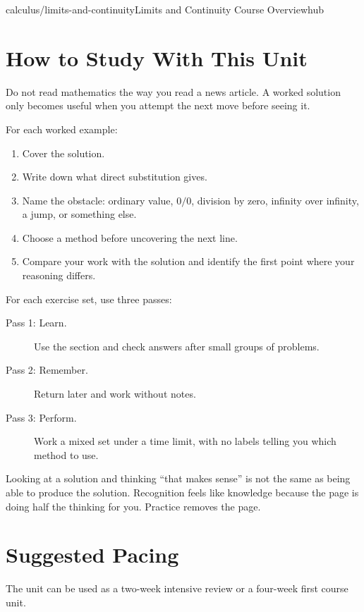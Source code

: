 \begin{webpage}{calculus/limits-and-continuity}{Limits and Continuity Course Overview}{hub}
\section*{How to Study With This Unit}

Do not read mathematics the way you read a news article. A worked solution only becomes useful when you attempt the next move before seeing it.

For each worked example:

\begin{enumerate}
  \item Cover the solution.
  \item Write down what direct substitution gives.
  \item Name the obstacle: ordinary value, \(0/0\), division by zero, infinity over infinity, a jump, or something else.
  \item Choose a method before uncovering the next line.
  \item Compare your work with the solution and identify the first point where your reasoning differs.
\end{enumerate}

For each exercise set, use three passes:

\begin{description}
  \item[Pass 1: Learn.] Use the section and check answers after small groups of problems.
  \item[Pass 2: Remember.] Return later and work without notes.
  \item[Pass 3: Perform.] Work a mixed set under a time limit, with no labels telling you which method to use.
\end{description}

\begin{bgsummary}
Looking at a solution and thinking ``that makes sense'' is not the same as being able to produce the solution. Recognition feels like knowledge because the page is doing half the thinking for you. Practice removes the page.
\end{bgsummary}

\section*{Suggested Pacing}

The unit can be used as a two-week intensive review or a four-week first course unit.


\end{webpage}
